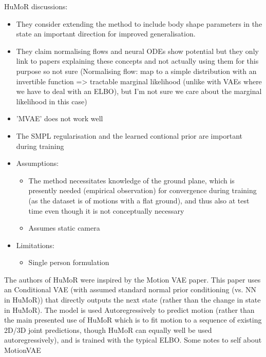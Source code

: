 HuMoR discussions:
\begin{itemize}
    \item They consider extending the method to include body shape parameters in the state an important direction for improved generalisation.
    \item They claim normalising flows and neural ODEs show potential but they only link to papers explaining these concepts and not actually using them for this purpose so not sure (Normalising flow: map to a simple distribution with an invertible function => tractable marginal likelihood (unlike with VAEs where we have to deal with an ELBO), but I'm not sure we care about the marginal likelihood in this case)
    \item 'MVAE' does not work well
    \item The SMPL regularisation and the learned contional prior are important during training
    \item Assumptions:
    \begin{itemize}
        \item The method necessitates knowledge of the ground plane, which is presently needed (empirical observation) for convergence during training (as the dataset is of motions with a flat ground), and thus also at test time even though it is not conceptually necessary
        \item Assumes static camera
    \end{itemize}
    \item Limitations:
    \begin{itemize}
        \item Single person formulation
    \end{itemize}
\end{itemize}


The authors of HuMoR \cite{rempe2021humor} were inspired by the Motion VAE \cite{TODO} paper. This paper uses an Conditional VAE (with assumed standard normal prior conditioning (vs. NN in HuMoR)) that directly outputs the next state (rather than the change in state in HuMoR). The model is used Autoregressively to predict motion (rather than the main presented use of HuMoR which is to fit motion to a sequence of existing 2D/3D joint predictions, though HuMoR can equally well be used autoregressively), and is trained with the typical ELBO.
Some notes to self about MotionVAE
\begin{itemize}
    \item MotionVAE is used with Deep RL with the action space taken to be the latent space of the CVAE, with a reward function that defines goals of a character, the control policy walks through the actions space to guide the generative model in accordance with these goals. Could be interesting for interactive character animation
    \item Contains a nice overview of motion prediction methods
\end{itemize}
